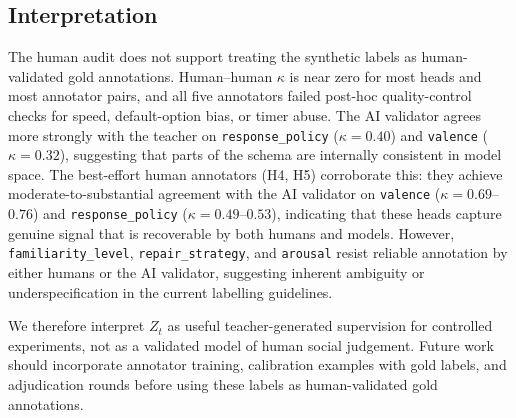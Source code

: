 \documentclass[11pt]{article}
\begin{document}
\subsection{Interpretation}

The human audit does not support treating the synthetic labels as human-validated gold annotations.
Human--human $\kappa$ is near zero for most heads and most annotator pairs, and all five annotators failed post-hoc quality-control checks for speed, default-option bias, or timer abuse.
The AI validator agrees more strongly with the teacher on \texttt{response\_policy} ($\kappa{=}0.40$) and \texttt{valence} ($\kappa{=}0.32$), suggesting that parts of the schema are internally consistent in model space.
The best-effort human annotators (H4, H5) corroborate this: they achieve moderate-to-substantial agreement with the AI validator on \texttt{valence} ($\kappa{=}0.69$--$0.76$) and \texttt{response\_policy} ($\kappa{=}0.49$--$0.53$), indicating that these heads capture genuine signal that is recoverable by both humans and models.
However, \texttt{familiarity\_level}, \texttt{repair\_strategy}, and \texttt{arousal} resist reliable annotation by either humans or the AI validator, suggesting inherent ambiguity or underspecification in the current labelling guidelines.

We therefore interpret $Z_t$ as useful teacher-generated supervision for controlled experiments, not as a validated model of human social judgement.
Future work should incorporate annotator training, calibration examples with gold labels, and adjudication rounds before using these labels as human-validated gold annotations.
\end{document}
